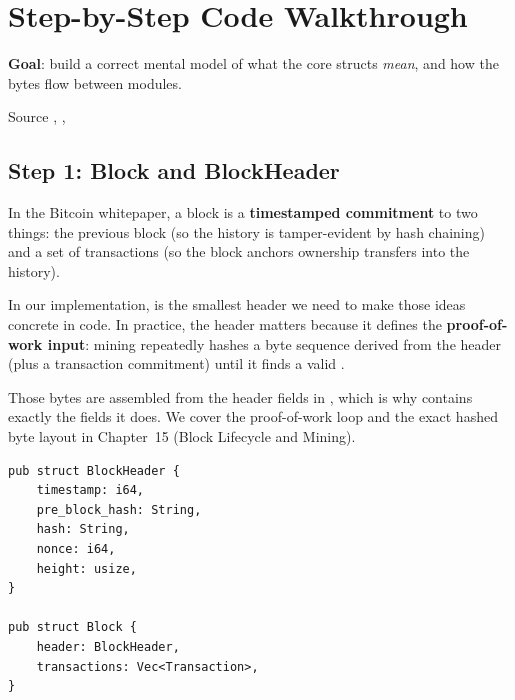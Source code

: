 \section{Step-by-Step Code Walkthrough}
\label{sec:walkthrough}

\textbf{Goal}: build a correct mental model of what the core structs
\emph{mean}, and how the bytes flow between modules.

\begin{infobox}{Source}
,
,
\end{infobox}

\subsection{Step 1: Block and BlockHeader}
\label{sec:step1-block}

In the Bitcoin whitepaper, a block is a \textbf{timestamped commitment}
to two things: the previous block (so the history is tamper-evident by
hash chaining) and a set of transactions (so the block anchors ownership
transfers into the history).

In our implementation,  is the smallest header we need
to make those ideas concrete in code. In practice, the header matters
because it defines the \textbf{proof-of-work input}: mining repeatedly
hashes a byte sequence derived from the header (plus a transaction
commitment) until it finds a valid .

Those bytes are assembled from the header fields in
, which is why 
contains exactly the fields it does. We cover the proof-of-work loop
and the exact hashed byte layout in Chapter~15 (Block Lifecycle and
Mining).

\begin{listing}[htbp]
\caption{Block and BlockHeader struct layout ()}
\label{lst:9-1}
\begin{verbatim}
pub struct BlockHeader {
    timestamp: i64,
    pre_block_hash: String,
    hash: String,
    nonce: i64,
    height: usize,
}

pub struct Block {
    header: BlockHeader,
    transactions: Vec<Transaction>,
}
\end{verbatim}
\end{listing}

